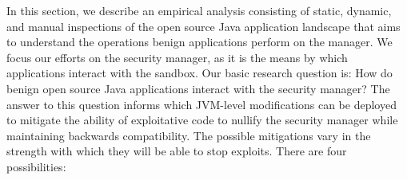 \documentclass{sig-alternate}
\begin{document}
In this section, we describe an empirical analysis consisting of static,
dynamic, and manual inspections of the open source Java application landscape
that aims to understand the operations benign applications perform on the
manager. We focus our efforts on the security manager, as it is the
means by which applications interact with the sandbox.
%
Our basic research question is: How do benign open source Java applications interact
with the security manager? The answer to this question informs which JVM-level
modifications can be deployed to mitigate the ability of exploitative code to
nullify the security manager while maintaining backwards compatibility.  The
possible mitigations vary in the strength with which they will be able to stop
exploits. 
There are four possibilities:
\end{document}
